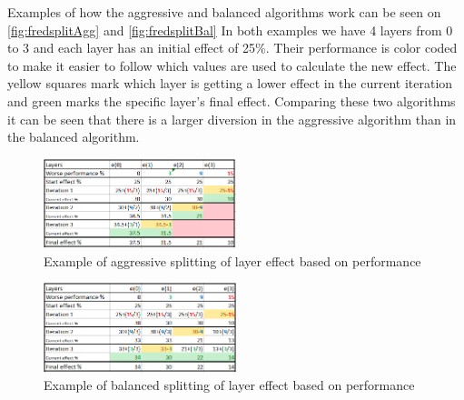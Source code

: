 Examples of how the aggressive and balanced algorithms work can be seen on \autoref{fig:fredsplitAgg} and \autoref{fig:fredsplitBal}
In both examples we have 4 layers from 0 to 3 and each layer has an initial effect of 25\%.
Their performance is color coded to make it easier to follow which values are used to calculate the new effect.
The yellow squares mark which layer is getting a lower effect in the current iteration and green marks the specific layer's final effect.
Comparing these two algorithms it can be seen that there is a larger diversion in the aggressive algorithm than in the balanced algorithm.

\begin{figure}
    \includegraphics[width=0.5\textwidth]{figures/fredsplit/aggresiveAlgo.png}
    \centering
    \caption{Example of aggressive splitting of layer effect based on performance}
    \label{fig:fredsplitAgg}
\end{figure}

\begin{figure}
    \includegraphics[width=0.5\textwidth]{figures/fredsplit/balancedAlgo.png}
    \centering
    \caption{Example of balanced splitting of layer effect based on performance}
    \label{fig:fredsplitBal}
\end{figure}



